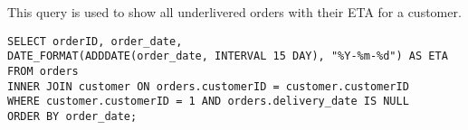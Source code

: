This query is used to show all underlivered orders with their ETA for a customer.

\begin{lstlisting}
SELECT orderID, order_date,
DATE_FORMAT(ADDDATE(order_date, INTERVAL 15 DAY), "%Y-%m-%d") AS ETA
FROM orders
INNER JOIN customer ON orders.customerID = customer.customerID
WHERE customer.customerID = 1 AND orders.delivery_date IS NULL
ORDER BY order_date;
\end{lstlisting}